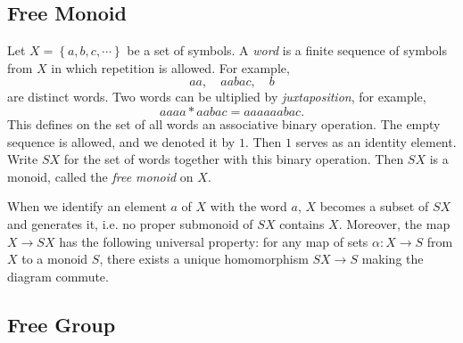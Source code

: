 \subsection{Free Monoid}
\label{subsection-free-monoid}

\begin{definition}
  \label{definition-word}
  \label{definition-free-monoid}
  Let \( X = \left\lbrace a, b, c, \cdots \right\rbrace \) be a set of symbols.
  A \emph{word} is a finite sequence of symbols from \( X \) in which repetition is allowed.
  For example,
  \[
    aa,\quad aabac,\quad b
  \]
  are distinct words.
  Two words can be ultiplied by \emph{juxtaposition}, for example,
  \[
    aaaa * aabac = aaaaaabac.
  \]
  This defines on the set of all words an associative binary operation.
  The empty sequence is allowed, and we denoted it by \( 1 \).
  Then \( 1 \) serves as an identity element.
  Write \( SX \) for the set of words together with this binary operation.
  Then \( SX \) is a monoid, called the \emph{free monoid} on \( X \).
\end{definition}

\begin{proposition}
  \label{proposition-free-monoid-universal-property}
  When we identify an element \( a \) of \( X \) with the word \( a \), \( X \) becomes a subset of \( SX \) and generates it, i.e. no proper submonoid of \( SX \) contains \( X \).
  Moreover, the map \( X \to SX \) has the following universal property: for any map of sets \( \alpha: X \to S \) from \( X \) to a monoid \( S \), there exists a unique homomorphism \( SX \to S \) making the diagram commute.
\begin{center}
\end{center}
\end{proposition}

\subsection{Free Group}
\label{subsection-free-group}

